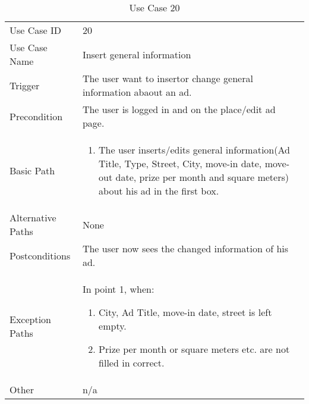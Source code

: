 \begin{table}[H]
\centering
\label{table-use-case-20}
\begin{tabular}{|p{3cm}|p{10cm}}
Use Case ID       & 20                                                      \\
Use Case Name     & Insert general information                            \\
Trigger           & The user want to insertor change general information abaout
an ad.
\\
Precondition      & The user is logged in and on the place/edit ad page.           
\\
Basic Path        & \begin{enumerate}
\item		The user inserts/edits general information(Ad Title, Type, Street, City,
move-in date, move-out date, prize per month and square meters) about his ad in
the first box.
\end{enumerate} \\
Alternative Paths & None                          \\
Postconditions    & The user now sees the changed information of his ad.	\\
Exception Paths   & In point 1, when: \begin{enumerate}
  \item 		City, Ad Title, move-in date, street is left empty.
  \item			Prize per month or square meters etc. are not filled in correct.
\end{enumerate}			\\
Other             & n/a                                                                                                                                                                                                        
\end{tabular}
\caption{Use Case 20}
\end{table}

